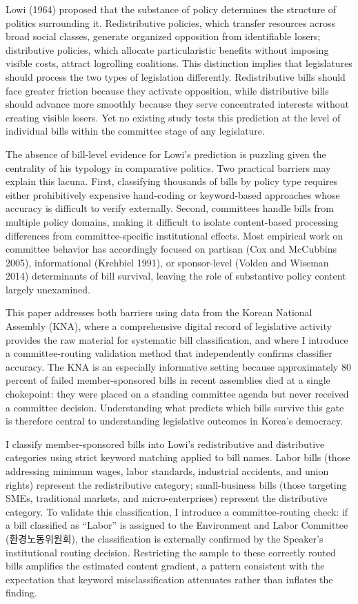 \documentclass[11pt]{article}
\begin{document}
Lowi (1964) proposed that the substance of policy determines the structure of politics surrounding it. Redistributive policies, which transfer resources across broad social classes, generate organized opposition from identifiable losers; distributive policies, which allocate particularistic benefits without imposing visible costs, attract logrolling coalitions. This distinction implies that legislatures should process the two types of legislation differently. Redistributive bills should face greater friction because they activate opposition, while distributive bills should advance more smoothly because they serve concentrated interests without creating visible losers. Yet no existing study tests this prediction at the level of individual bills within the committee stage of any legislature.

The absence of bill-level evidence for Lowi's prediction is puzzling given the centrality of his typology in comparative politics. Two practical barriers may explain this lacuna. First, classifying thousands of bills by policy type requires either prohibitively expensive hand-coding or keyword-based approaches whose accuracy is difficult to verify externally. Second, committees handle bills from multiple policy domains, making it difficult to isolate content-based processing differences from committee-specific institutional effects. Most empirical work on committee behavior has accordingly focused on partisan (Cox and McCubbins 2005), informational (Krehbiel 1991), or sponsor-level (Volden and Wiseman 2014) determinants of bill survival, leaving the role of substantive policy content largely unexamined.

This paper addresses both barriers using data from the Korean National Assembly (KNA), where a comprehensive digital record of legislative activity provides the raw material for systematic bill classification, and where I introduce a committee-routing validation method that independently confirms classifier accuracy. The KNA is an especially informative setting because approximately 80 percent of failed member-sponsored bills in recent assemblies died at a single chokepoint: they were placed on a standing committee agenda but never received a committee decision. Understanding what predicts which bills survive this gate is therefore central to understanding legislative outcomes in Korea's democracy.

I classify member-sponsored bills into Lowi's redistributive and distributive categories using strict keyword matching applied to bill names. Labor bills (those addressing minimum wages, labor standards, industrial accidents, and union rights) represent the redistributive category; small-business bills (those targeting SMEs, traditional markets, and micro-enterprises) represent the distributive category. To validate this classification, I introduce a committee-routing check: if a bill classified as ``Labor'' is assigned to the Environment and Labor Committee (환경노동위원회), the classification is externally confirmed by the Speaker's institutional routing decision. Restricting the sample to these correctly routed bills amplifies the estimated content gradient, a pattern consistent with the expectation that keyword misclassification attenuates rather than inflates the finding.
\end{document}
